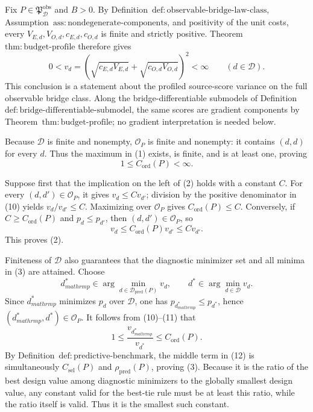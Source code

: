 Fix \(P\in\mathfrak P_{\mathcal D}^{\mathrm{obs}}\) and \(B>0\).  By Definition~\(\mathrm{def{:}observable\text{-}bridge\text{-}law\text{-}class}\), Assumption~\(\mathrm{ass{:}nondegenerate\text{-}components}\), and positivity of the unit costs, every \(V_{E,d},V_{O,d},c_{E,d},c_{O,d}\) is finite and strictly positive.  Theorem~\(\mathrm{thm{:}budget\text{-}profile}\) therefore gives
\[
 0<v_d
 =\left(\sqrt{c_{E,d}V_{E,d}}+
          \sqrt{c_{O,d}V_{O,d}}\right)^2
 <\infty
 \qquad(d\in\mathcal D).                                      \tag{10}
\]
This conclusion is a statement about the profiled source-score variance on the full observable bridge class.  Along the bridge-differentiable submodels of Definition~\(\mathrm{def{:}bridge\text{-}differentiable\text{-}submodel}\), the same scores are gradient components by Theorem~\(\mathrm{thm{:}budget\text{-}profile}\); no gradient interpretation is needed below.

Because \(\mathcal D\) is finite and nonempty, \(\mathcal O_P\) is finite and nonempty: it contains \((d,d)\) for every \(d\).  Thus the maximum in (1) exists, is finite, and is at least one, proving
\[
 1\le C_{\mathrm{ord}}(P)<\infty.                             \tag{11}
\]

Suppose first that the implication on the left of (2) holds with a constant \(C\).  For every \((d,d')\in\mathcal O_P\), it gives \(v_d\le Cv_{d'}\); division by the positive denominator in (10) yields \(v_d/v_{d'}\le C\).  Maximizing over \(\mathcal O_P\) gives \(C_{\mathrm{ord}}(P)\le C\).  Conversely, if \(C\ge C_{\mathrm{ord}}(P)\) and \(p_d\le p_{d'}\), then \((d,d')\in\mathcal O_P\), so
\[
 v_d\le C_{\mathrm{ord}}(P)v_{d'}\le Cv_{d'}.
\]
This proves (2).

Finiteness of \(\mathcal D\) also guarantees that the diagnostic minimizer set and all minima in (3) are attained.  Choose
\[
 d_{mathrm p}^*\in
 \arg\min_{d\in\mathcal D_{\mathrm{pred}}(P)}v_d,
 \qquad
 d^*\in\arg\min_{d\in\mathcal D}v_d.
\]
Since \(d_{mathrm p}^*\) minimizes \(p_d\) over \(\mathcal D\), one has \(p_{d_{mathrm p}^*}\le p_{d^*}\), hence \((d_{mathrm p}^*,d^*)\in\mathcal O_P\).  It follows from (10)--(11) that
\[
 1\le
 \frac{v_{d_{mathrm p}^*}}{v_{d^*}}
 \le C_{\mathrm{ord}}(P).                                    \tag{12}
\]
By Definition~\(\mathrm{def{:}predictive\text{-}benchmark}\), the middle term in (12) is simultaneously \(C_{\mathrm{sel}}(P)\) and \(\rho_{\mathrm{pred}}(P)\), proving (3).  Because it is the ratio of the best design value among diagnostic minimizers to the globally smallest design value, any constant valid for the best-tie rule must be at least this ratio, while the ratio itself is valid.  Thus it is the smallest such constant.

